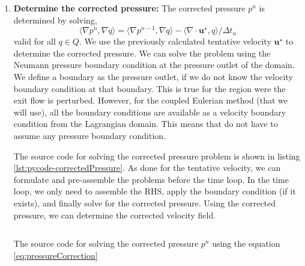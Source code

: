 \begin{enumerate}
		\begin{listing}[t]
		\inputminted[fontseries=courier,obeytabs,fontsize=\scriptsize,mathescape,linenos,numbersep=5pt,frame=lines,framesep=2mm,xleftmargin=20mm,xrightmargin=20mm]{python}{figures/eulerian/tentativeVelocity.py}
		\caption{The source code for solving the tentative velocity $\mathbf{u}^{\star}$, using the equation \ref{eq:tentativeVel}}
		\label{lst:pycode-tentativeVelocity}
		\end{listing}
	
	\item \textbf{Determine the corrected pressure:} The corrected pressure $p^n$ is determined by solving,	
		\begin{equation}
		\langle \nabla p^n, \nabla q \rangle = \langle \nabla p^{n-1}, \nabla q\rangle - \langle \nabla \cdot \mathbf{u}^{\star}, q \rangle / \Delta t_n
		\label{eq:pressureCorrection}
		\end{equation}
	valid for all $q \in Q$. We use the previously calculated tentative velocity $\mathbf{u}^{\star}$ to determine the corrected pressure. We can solve the problem using the Neumann pressure boundary condition at the pressure outlet of the domain. We define a boundary as the pressure outlet, if we do not know the velocity boundary condition at that boundary. This is true for the region were the exit flow is perturbed. However, for the coupled Eulerian method (that we will use), all the boundary conditions are available as a velocity boundary condition from the Lagrangian domain. This means that do not have to assume any pressure boundary condition.

	The source code for solving the corrected pressure problem is shown in listing \ref{lst:pycode-correctedPressure}. As done for the tentative velocity, we can formulate and pre-assemble the problems before the time loop. In the time loop, we only need to assemble the RHS, apply the boundary condition (if it exists), and finally solve for the corrected pressure. Using the corrected pressure, we can determine the corrected velocity field. 
		
		\begin{listing}[p]
		\inputminted[fontseries=courier,obeytabs,fontsize=\scriptsize,mathescape,linenos,numbersep=5pt,frame=lines,framesep=2mm,xleftmargin=20mm,xrightmargin=20mm]{python}{figures/eulerian/correctedPressure.py}
		\caption{The source code for solving the corrected pressure $p^n$ using the equation \ref{eq:pressureCorrection}}
		\label{lst:pycode-correctedPressure}
		\end{listing}
			

\end{enumerate}
